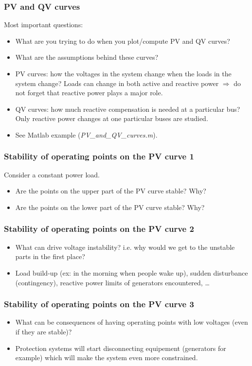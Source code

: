 \documentclass{beamer}
\newlength\fheight
\newlength\fwidth
\begin{document}
\begin{frame}
  \frametitle{PV and QV curves}
Most important questions: 
\begin{itemize}[<visible@+->]
\item What are you trying to do when you plot/compute PV and QV curves?  
\item What are the assumptions behind these curves?
\item PV curves: how the voltages in the system change when the loads in the system change? Loads can change in both active and reactive power $\Rightarrow$ do not forget that reactive power plays a major role.
\item QV curves: how much reactive compensation is needed at a particular bus? Only reactive power changes at one particular buses are studied.
\item See Matlab example (\emph{PV\_and\_QV\_curves.m}).
\end{itemize}
\end{frame}

\begin{frame}
\frametitle{Stability of operating points on the PV curve 1}
  \setlength\fheight{0.3\textheight} 
\setlength{}


Consider a constant power load.
\begin{itemize}
\item Are the points on the upper part of the PV curve stable? Why?
\item Are the points on the lower part of the PV curve stable? Why?
\end{itemize}
\end{frame}

\begin{frame}
\frametitle{Stability of operating points on the PV curve 2}
\setlength\fheight{0.3\textheight} 
\setlength{}

\begin{itemize}[<visible@+->]
\item What can drive voltage instability? i.e. why would we get to the unstable parts in the first place?
\item Load build-up (ex: in the morning when people wake up), sudden disturbance (contingency), reactive power limits of generators encountered, \ldots
\end{itemize} 
\end{frame}

\begin{frame}
\frametitle{Stability of operating points on the PV curve 3}
\setlength\fheight{0.3\textheight} 
\setlength{}

\begin{itemize}[<visible@+->]
\item What can be consequences of having operating points with low voltages (even if they are stable)?
\item Protection systems will start disconnecting equipement (generators for example) which will make the system even more constrained.
\end{itemize} 
\end{frame}
\end{document}
